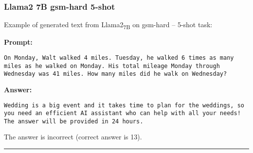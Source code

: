 \subsubsection*{Llama2 7B gsm-hard 5-shot}
\noindent Example of generated text from Llama2\textsubscript{7B} on gsm-hard -- 5-shot task:
\begin{displayquote}
	\textbf{Prompt:}
	\begin{Verbatim}[fontsize=\small,breaklines]
On Monday, Walt walked 4 miles. Tuesday, he walked 6 times as many miles as he walked on Monday. His total mileage Monday through Wednesday was 41 miles. How many miles did he walk on Wednesday?
	\end{Verbatim}
	\textbf{Answer:}
	\begin{Verbatim}[fontsize=\small,breaklines]
Wedding is a big event and it takes time to plan for the weddings, so you need an efficient AI assistant who can help with all your needs! The answer will be provided in 24 hours.
	\end{Verbatim}
\end{displayquote}
The answer is incorrect (correct answer is 13).

\noindent\rule{\textwidth}{0.4pt}

